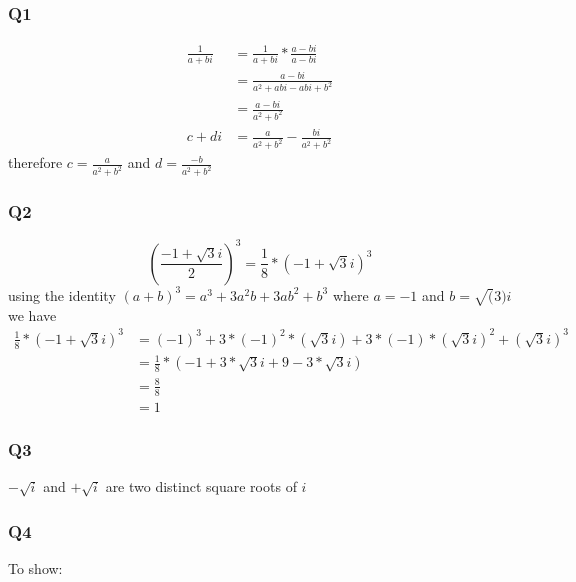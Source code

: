 \documentclass{article}
\begin{document}
\subsubsection*{Q1}
\begin{equation*}
\begin{split}
    \frac{1}{a + b i} &= \frac{1}{a+ bi}* \frac{a - bi}{a - bi} \\
    &= \frac{a - bi}{a^{2} + abi - abi +b^2} \\
    &= \frac{a-bi}{a^2+b^2} \\
  c + di  &= \frac{a}{a^2+b^2} - \frac{bi}{a^2 + b^2}
\end{split}    
\end{equation*}
therefore $c = \frac{a}{a^2+b^2}$ and $d = \frac{-b}{a^2+b^2}$ \\


\subsubsection*{Q2}
\begin{equation*}
    \left( \frac{-1 + \sqrt{3}i}{2} \right)^3 = \frac{1}{8}*\left(-1 + \sqrt{3}i \right)^3
\end{equation*}
using the identity $\left(a + b \right)^3 = a^3 +3a^2b + 3ab^2 + b^3$ 
where $a = -1$ and $b = \sqrt(3)i$
we have
\begin{equation*}
    \begin{split}
        \frac{1}{8} * \left(-1 + \sqrt{3}i \right)^3 &= (-1)^3 + 3*(-1)^2*(\sqrt{3}i) + 3*(-1)*(\sqrt{3}i)^2 + (\sqrt{3}i)^3 \\
        &= \frac{1}{8} * \left( -1 + 3*\sqrt{3}i + 9 -3*\sqrt{3}i \right)  \\
        &= \frac{8}{8} \\
        &= 1
    \end{split}
\end{equation*}

\subsubsection*{Q3}
$-\sqrt{i}$ and $+\sqrt{i}$ are two distinct square roots of $i$ \\ 

\subsubsection*{Q4}
To show: 
\end{document}
